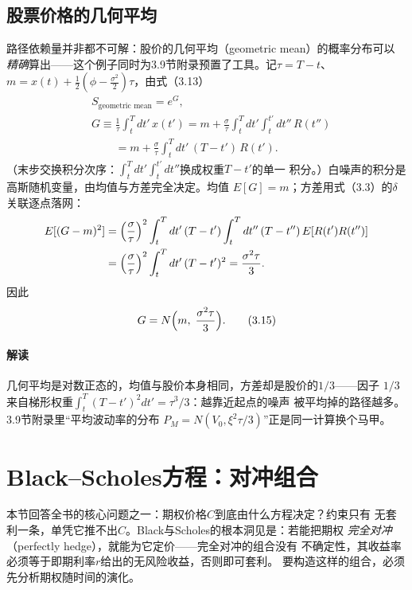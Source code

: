 \subsection*{股票价格的几何平均}

路径依赖量并非都不可解：股价的几何平均（geometric mean）的概率分布可以
\emph{精确}算出——这个例子同时为3.9节附录预置了工具。记$\tau=T-t$、
$m=x(t)+\frac{1}{2}(\phi-\frac{\sigma^{2}}{2})\tau$，由式（3.13）
\begin{align*}
&S_{\text{geometric mean}}=e^{G},\\
&G\equiv\frac{1}{\tau}\int_{t}^{T}dt'\,x(t')
=m+\frac{\sigma}{\tau}\int_{t}^{T}dt'\int_{t}^{t'}dt''\,R(t'')\\
&\phantom{G\equiv}=m+\frac{\sigma}{\tau}\int_{t}^{T}dt'\,(T-t')\,R(t').
\end{align*}
（末步交换积分次序：$\int_t^T dt'\int_t^{t'}dt''$换成权重$T-t'$的单一
积分。）白噪声的积分是高斯随机变量，由均值与方差完全决定。均值
$E[G]=m$；方差用式（3.3）的$\delta$关联逐点落网：
\begin{align*}
E[(G-m)^{2}]
&=\Bigl(\frac{\sigma}{\tau}\Bigr)^{2}\int_{t}^{T}dt'\,(T-t')
\int_{t}^{T}dt''\,(T-t'')\,E[R(t')R(t'')]\\
&=\Bigl(\frac{\sigma}{\tau}\Bigr)^{2}\int_{t}^{T}dt'\,(T-t')^{2}
=\frac{\sigma^{2}\tau}{3}.
\end{align*}
因此
\begin{equation*}
G=N\Bigl(m,\;\frac{\sigma^{2}\tau}{3}\Bigr).
\tag{3.15}
\end{equation*}
\paragraph{解读}
几何平均是对数正态的，均值与股价本身相同，方差却是股价的$1/3$——因子
$1/3$来自梯形权重$\int_t^T (T-t')^{2}dt'=\tau^{3}/3$：越靠近起点的噪声
被平均掉的路径越多。3.9节附录里“平均波动率的分布
$P_M=N(V_0,\xi^{2}\tau/3)$”正是同一计算换个马甲。

\section{Black--Scholes方程：对冲组合}

本节回答全书的核心问题之一：期权价格$C$到底由什么方程决定？约束只有
无套利一条，单凭它推不出$C$。Black与Scholes的根本洞见是：若能把期权
\emph{完全对冲}（perfectly hedge），就能为它定价——完全对冲的组合没有
不确定性，其收益率必须等于即期利率$r$给出的无风险收益，否则即可套利。
要构造这样的组合，必须先分析期权随时间的演化。


